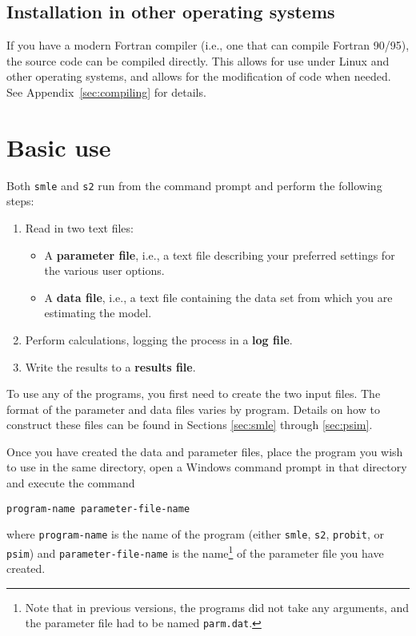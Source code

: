 \documentclass{article}
\begin{document}
\subsection{Installation in other operating systems}

If you have a modern Fortran compiler (i.e., one that can compile Fortran 90/95), 
the source code can be compiled directly.  This allows for use under Linux and other 
operating systems, and allows for the modification of code when needed.  
See Appendix~\ref{sec:compiling} for details.


\section{Basic use}

Both {\tt smle} and {\tt s2} run from the command prompt and perform the following
steps:
\begin{enumerate}
	\item Read in two text files:
		\begin{itemize}
			\item A {\bf parameter file}, i.e., a text file describing
				your preferred settings for the various user options.  
			\item A {\bf data file}, i.e., a text file containing the 
				data set from which you are estimating the model.
	\end{itemize}
	\item Perform calculations, logging the process in a {\bf log file}.
	\item Write the results to a {\bf results file}.
\end{enumerate}
To use any of the programs, you first need to create the two input files.
The format of the parameter and data files varies by program.
Details on how to construct these files can be found in Sections \ref{sec:smle} through \ref{sec:psim}.

Once you have created the data and parameter files, place the program you wish
to use in the same directory, open a Windows command prompt in that directory
and execute the command \\
\begin{center}
{\tt program-name parameter-file-name}
\end{center}
where
{\tt program-name} is the name of the program (either {\tt smle}, {\tt s2},
{\tt probit}, or {\tt psim}) and {\tt parameter-file-name} is the name\footnote{Note that
in previous versions, the programs did not take any arguments, and the parameter file 
had to be named {\tt parm.dat}.} of the parameter file you have created.
\end{document}
